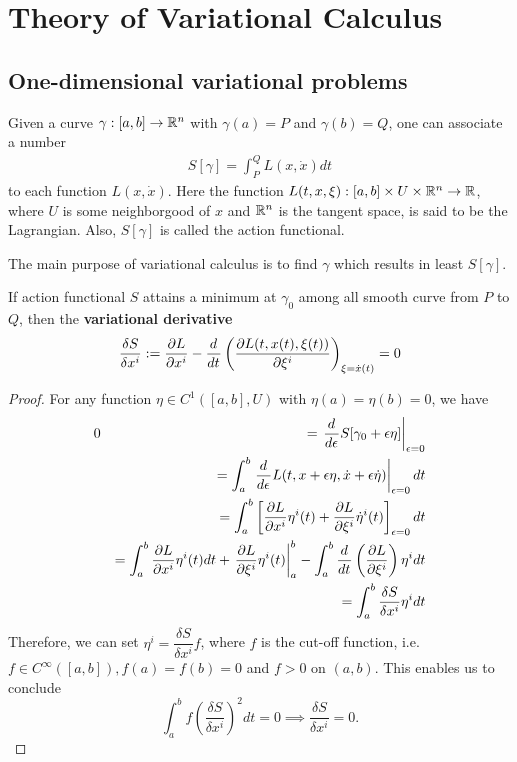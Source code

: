 \newpage
\section{Theory of Variational Calculus}
\subsection{One-dimensional variational problems}
\begin{definition}
	Given a curve $\gamma:[a, b] \rightarrow \mathbb{R}^n$ with $\gamma(a) = P$ and $\gamma(b) = Q$, one can associate a number
	\begin{eqnarray}
		S[\gamma] = \int_{P}^{Q} L(x, \dot{x}) dt
	\end{eqnarray}
	to each function $L(x, \dot{x})$. Here the function $L(t, x, \xi): [a, b] \times U \times \mathbb{R}^n \rightarrow \mathbb{R}$, where $U$ is some neighborgood of $x$ and $\mathbb{R}^n$ is the tangent space, is said to be the Lagrangian. Also, $S[\gamma]$ is called the action functional.
\end{definition}

The main purpose of variational calculus is to find $\gamma$ which results in least $S[\gamma]$.

\begin{theorem}
	If action functional $S$ attains a minimum at $\gamma_0$ among all smooth curve from $P$ to $Q$, then the \textbf{variational derivative}
	\begin{eqnarray}
	\frac{\delta S}{\delta x^i} := \frac{ \partial L}{ \partial x^i } - \frac{d^{}  }{d t^{}}\left( \frac{ \partial L(t, x(t), \xi(t))}{ \partial \xi^i }  \right)_{\xi = \dot{x}(t)} = 0
	\end{eqnarray}
\end{theorem}

\begin{proof}
	For any function $\eta \in C^1([a, b], U)$ with $\eta(a) = \eta(b) = 0$, we have
	\begin{eqnarray}
	0 &&= \left.\frac{d^{}  }{d \epsilon^{}} S[\gamma_0 + \epsilon \eta] \right|_{\epsilon = 0}
	\nonumber\\
	&&= \int_{a}^{b} \left. \frac{d^{} }{d \epsilon^{}} L(t, x + \epsilon \eta, \dot{x} + \epsilon \dot{\eta}) \right|_{\epsilon = 0} dt
	\nonumber\\
	&&= \int_{a}^{b} \left[ \frac{ \partial L}{ \partial x^i }\eta^i(t) + \frac{ \partial L}{ \partial \xi^i } \dot{\eta}^i(t) \right]_{\epsilon = 0} dt
	\nonumber\\
	&&= \int_{a}^{b} \frac{ \partial L}{ \partial x^i }\eta^i(t)dt + \left. \frac{ \partial L}{ \partial \xi^i } \eta^i(t) \right|_a^b - \int_{a}^{b} \frac{d^{}  }{d t^{}} \left( \frac{ \partial L}{ \partial \xi^i } \right) \eta^i dt
	\nonumber\\
	&&= \int_{a}^{b} \frac{\delta S}{\delta x^i} \eta^i dt
	\end{eqnarray}
	Therefore, we can set $\eta^i = \dfrac{\delta S}{\delta x^i} f$, where $f$ is the cut-off function, i.e. $f \in C^{\infty}([a, b]), f(a) = f(b) = 0$ and $f>0$ on $(a, b)$. This enables us to conclude
	\[ \int_{a}^{b} f \left( \frac{\delta S}{\delta x^i} \right)^2 dt = 0 \implies \frac{\delta S}{\delta x^i} = 0. \]
\end{proof}

